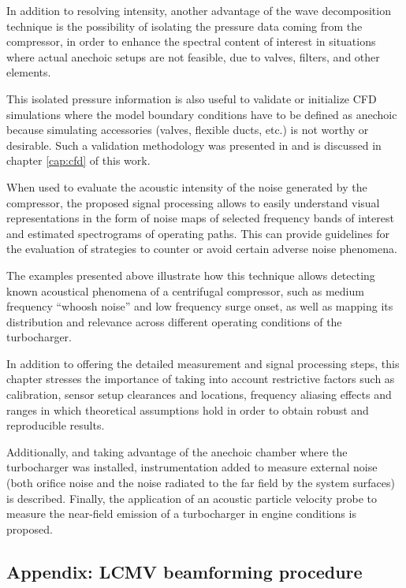 In addition to resolving intensity, another advantage of the wave decomposition technique is the possibility of isolating the pressure data coming from the compressor, in order to enhance the spectral content of interest in situations where actual anechoic setups are not feasible, due to valves, filters, and other elements.

This isolated pressure information is also useful to validate or initialize CFD simulations where the model boundary conditions have to be defined as anechoic because simulating accessories (valves, flexible ducts, etc.) is not worthy or desirable. Such a validation methodology was presented in \cite{broatch2014methodology} and is discussed in chapter \ref{cap:cfd} of this work.

When used to evaluate the acoustic intensity of the noise generated by the compressor, the proposed signal processing allows to easily  understand visual representations in the form of noise maps of selected frequency bands of interest and estimated spectrograms of operating paths. This can provide guidelines for the evaluation of strategies to counter or avoid certain adverse noise phenomena.

The examples presented above illustrate how this technique allows detecting known acoustical phenomena of a centrifugal compressor, such as medium frequency ``whoosh noise'' and low frequency surge onset, as well as mapping its distribution and relevance across different operating conditions of the turbocharger.

In addition to offering the detailed measurement and signal processing steps, this chapter stresses the importance of taking into account restrictive factors such as calibration, sensor setup clearances and locations, frequency aliasing effects and ranges in which theoretical assumptions hold in order to obtain robust and reproducible results.

Additionally, and taking advantage of the anechoic chamber where the turbocharger was installed, instrumentation added to measure external noise (both orifice noise and the noise radiated to the far field by the system surfaces) is described. Finally, the application of an acoustic particle velocity probe to measure the near-field emission of a turbocharger in engine conditions is proposed.

\subsection{Appendix: LCMV beamforming procedure}
\label{ann:beamformer}

